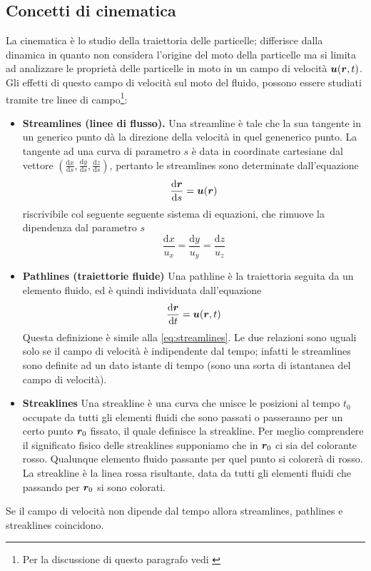 \subsection{Concetti di cinematica}
La cinematica è lo studio della traiettoria delle particelle; differisce dalla dinamica in quanto non considera l'origine del moto della particelle ma si limita ad analizzare le proprietà delle particelle in moto in un campo di velocità $\V{u}(\V{r},t)$. Gli effetti di questo campo di velocità sul moto del fluido, possono essere studiati tramite tre linee di campo\footnote{Per la discussione di questo paragrafo vedi \cite{book:Clarke}}:
\begin{itemize}
\item \textbf{Streamlines (linee di flusso).} Una streamline è tale che la sua tangente in un generico punto dà la direzione della velocità in quel genenerico punto. La tangente ad una curva di parametro $s$ è data in coordinate cartesiane dal vettore $(\frac{\mathrm{d}x}{\mathrm{d}s},\frac{\mathrm{d}y}{\mathrm{d}s},\frac{\mathrm{d}z}{\mathrm{d}s})$, pertanto le streamlines sono determinate dall'equazione
\begin{equation}
\frac{\mathrm{d}\V{r}}{\mathrm{d}s} = \V{u}(\V{r}) \label{eq:streamlines}
\end{equation}
riscrivibile col seguente seguente sistema di equazioni, che rimuove la dipendenza dal parametro $s$
\begin{equation}
\frac{\mathrm{d}x}{u_x} = \frac{\mathrm{d}y}{u_y} = \frac{\mathrm{d}z}{u_z} 
\end{equation}
\item \textbf{Pathlines (traiettorie fluide)} Una pathline è la traiettoria seguita da un elemento fluido, ed è quindi individuata dall'equazione
\begin{equation}
\frac{\mathrm{d}\V{r}}{\mathrm{d}t} = \V{u}(\V{r},t)
\end{equation}
Questa definizione è simile alla \ref{eq:streamlines}. Le due relazioni sono uguali solo se il campo di velocità è indipendente dal tempo; infatti le streamlines sono definite ad un dato istante di tempo (sono una sorta di istantanea del campo di velocità).
\item \textbf{Streaklines} Una streakline è una curva che unisce le posizioni al tempo $t_0$ occupate da tutti gli elementi fluidi che sono passati o passeranno per un certo punto $\V{r}_0$ fissato, il quale definisce la streakline. Per meglio comprendere il significato fisico delle streaklines supponiamo che in $\V{r}_0$ ci sia del colorante rosso. Qualunque elemento fluido passante per quel punto si colorerà di rosso. La streakline è la linea rossa risultante, data da tutti gli elementi fluidi che passando per $\V{r}_0$ si sono colorati.
\end{itemize}
Se il campo di velocità non dipende dal tempo allora streamlines, pathlines e streaklines coincidono.

